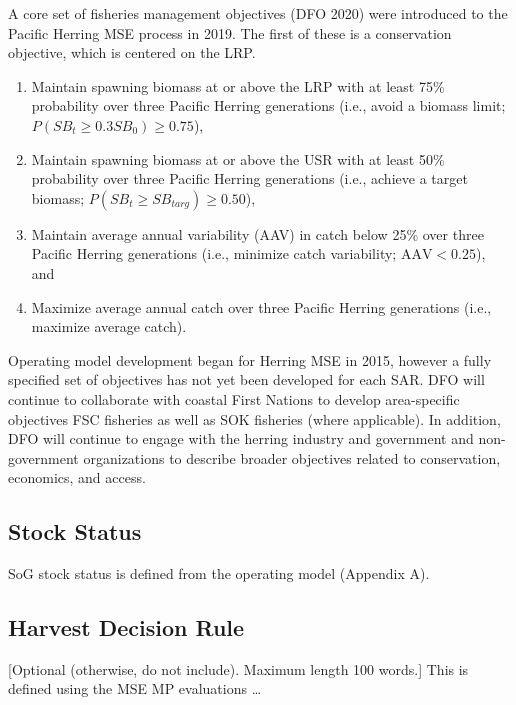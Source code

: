 \documentclass[11pt]{book}
\begin{document}
A core set of fisheries management objectives (DFO 2020) were introduced to the Pacific Herring MSE process in 2019. The first of these is a conservation objective, which is centered on the LRP.
\begin{enumerate}
\def\labelenumi{\arabic{enumi}.}
\item
  Maintain spawning biomass at or above the LRP with at least 75\% probability over three Pacific Herring generations (i.e., avoid a biomass limit; \(P(\mathit{SB}_t \geq 0.3 \mathit{SB}_0) \geq 0.75\)),
\item
  Maintain spawning biomass at or above the USR with at least 50\% probability over three Pacific Herring generations (i.e., achieve a target biomass; \(P(\mathit{SB}_t \geq \mathit{SB}_{targ}) \geq 0.50\)),
\item
  Maintain average annual variability (AAV) in catch below 25\% over three Pacific Herring generations (i.e., minimize catch variability; \(\text{AAV} < 0.25\)), and
\item
  Maximize average annual catch over three Pacific Herring generations (i.e., maximize average catch).
\end{enumerate}
Operating model development began for Herring MSE in 2015, however a fully specified set of objectives has not yet been developed for each SAR. DFO will continue to collaborate with coastal First Nations to develop area-specific objectives FSC fisheries as well as SOK fisheries (where applicable). In addition, DFO will continue to engage with the herring industry and government and non-government organizations to describe broader objectives related to conservation, economics, and access.

\hypertarget{stock-status}{%
\subsection*{Stock Status}\label{stock-status}}

SoG stock status is defined from the operating model (Appendix A).

\hypertarget{harvest-decision-rule}{%
\subsection*{Harvest Decision Rule}\label{harvest-decision-rule}}

{[}Optional (otherwise, do not include). Maximum length 100 words.{]} This is defined using the MSE MP evaluations \ldots{}
\end{document}
